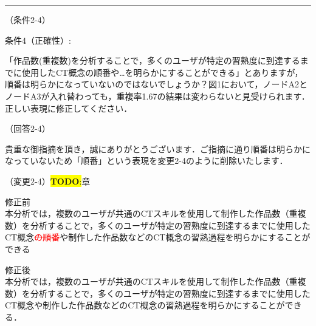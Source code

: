 \documentclass{jarticle} %
\newcommand{\todo}[1]{\colorbox{yellow}{{\bf TODO}:}{\color{blue}{\textbf{[#1]}}}}
\def\subsection#1{ \vspace{1pc} {\gt #1} }
\def\nextans{ \vspace{2pc} \hrule }
\begin{document}


\newpage
\nextans
\subsection{（条件2-4）}

条件4（正確性）: 

「作品数(重複数)を分析することで，多くのユーザが特定の習熟度に到達するまでに使用したCT概念の順番や…を明らかにすることができる」とありますが，順番は明らかになっていないのではないでしょうか？図1において，ノードA2とノードA3が入れ替わっても，重複率1.67の結果は変わらないと見受けられます．正しい表現に修正してください．

\subsection{（回答2-4）}

貴重な御指摘を頂き，誠にありがとうございます．ご指摘に通り順番は明らかになっていないため「順番」という表現を変更2-4のように削除いたします．

\subsection{（変更2-4）\todo{todo}章}
\vspace{-0.3cm}
\begin{description}
\item 修正前\\
\phantom{　}
本分析では，複数のユーザが共通のCTスキルを使用して制作した作品数（重複数）を分析することで，多くのユーザが特定の習熟度に到達するまでに使用したCT概念\textcolor{red}{\sout{の順番}}や制作した作品数などのCT概念の習熟過程を明らかにすることができる

\vspace{-0.3cm}
\item 修正後\\
\phantom{　}
本分析では，複数のユーザが共通のCTスキルを使用して制作した作品数（重複数）を分析することで，多くのユーザが特定の習熟度に到達するまでに使用したCT概念や制作した作品数などのCT概念の習熟過程を明らかにすることができる．
\end{description}
\end{document}
